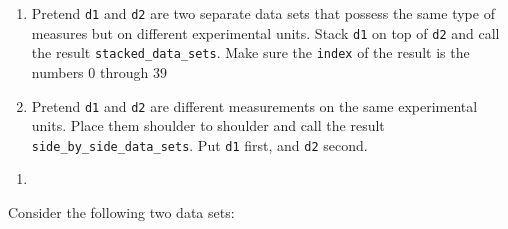 \documentclass[
  12pt,
  krantz2]{krantz}
\providecommand{\tightlist}{%
  \setlength{\itemsep}{0pt}\setlength{\parskip}{0pt}}
\begin{document}
\begin{enumerate}
\def\labelenumi{\alph{enumi})}
\tightlist
\item
  Pretend \texttt{d1} and \texttt{d2} are two separate data sets that possess the same type of measures but on different experimental units. Stack \texttt{d1} on top of \texttt{d2} and call the result \texttt{stacked\_data\_sets}. Make sure the \texttt{index} of the result is the numbers \(0\) through \(39\)
\item
  Pretend \texttt{d1} and \texttt{d2} are different measurements on the same experimental units. Place them shoulder to shoulder and call the result \texttt{side\_by\_side\_data\_sets}. Put \texttt{d1} first, and \texttt{d2} second.
\end{enumerate}

\begin{enumerate}
\def\labelenumi{\arabic{enumi}.}
\setcounter{enumi}{2}
\tightlist
\item
\end{enumerate}

Consider the following two data sets:
\end{document}
